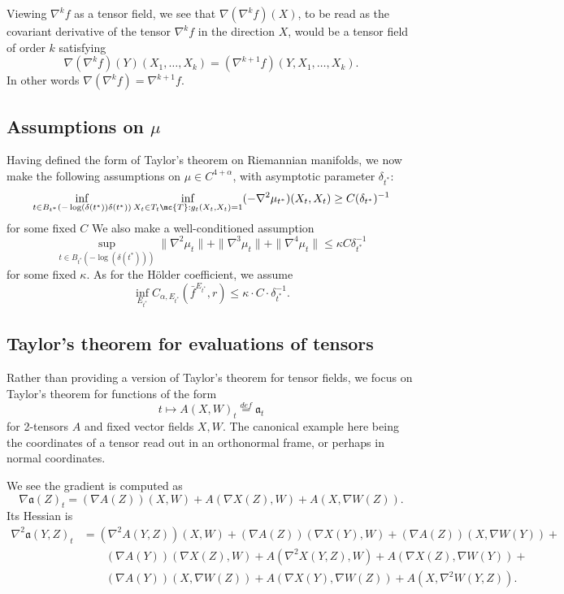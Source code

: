\documentclass{article}
\begin{document}
Viewing $\nabla^{k} f$ as a tensor field, we see that $\nabla ( \nabla^k f)(X)$, to be read as the covariant derivative of the tensor $\nabla^k f$ in the direction
$X$, would be a tensor field of order $k$ satisfying
$$
\nabla(\nabla^k f)(Y)(X_1, \dots, X_k) = (\nabla^{k+1} f)(Y, X_1, \dots, X_k).
$$
In other words $\nabla (\nabla^k f) = \nabla^{k+1} f$.

\subsection{Assumptions on $\mu$}

Having defined the form of Taylor's theorem on Riemannian manifolds, 
we now make the following assumptions on $\mu \in C^{4+\alpha}$, with asymptotic parameter $\delta_{t^*}$:
$$
\inf_{t \in B_{t^*}(-\log(\delta(t^*)) \delta(t^*))} \inf_{X_t \in T_t\mc{T}: g_t(X_t,X_t)=1} (-\nabla^2 \mu_{t^*})(X_t, X_t) \geq C (\delta_{t^*})^{-1}
$$
for some fixed $C$
  We also make a well-conditioned assumption 
  $$
\sup_{t \in B_{t^*}(-\log(\delta(t^*)))} \|\nabla^2 \mu_t\| + \|\nabla^3 \mu_t\| + \|\nabla^4 \mu_t\| \leq \kappa C \delta_{t^*}^{-1}
  $$
for some fixed $\kappa$. As for the H\"older coefficient, we assume
$$\inf_{E_{t^*}} C_{\alpha, E_{t^*}}(\bar{f}^{E_{t^*}}, r) \leq \kappa \cdot C \cdot \delta_{t^*}^{-1}.$$


\subsection{Taylor's theorem for evaluations of tensors}

Rather than providing a version of Taylor's theorem for tensor fields, we focus on Taylor's theorem for functions of
the form
$$
t \mapsto A(X,W)_t \overset{def}{=} \mathfrak{a}_t
$$
for 2-tensors $A$ and fixed vector fields $X, W$. The canonical example here being the coordinates
of a tensor read out in an orthonormal frame, or perhaps in normal coordinates.

We see the gradient is computed as
$$
\nabla \mathfrak{a}(Z)_t = (\nabla A(Z))(X, W) + A(\nabla X(Z), W) + A(X, \nabla W(Z)).
$$
Its Hessian is
$$
\begin{aligned}
  \nabla^2 \mathfrak{a}(Y, Z)_t &= (\nabla^2 A(Y,Z))(X, W) + (\nabla A(Z))(\nabla X(Y), W) + (\nabla A(Z))(X, \nabla W(Y)) + \\
& \qquad  (\nabla A(Y))(\nabla X(Z), W) + A(\nabla^2 X(Y, Z), W) + A(\nabla X(Z), \nabla W(Y)) + \\
& \qquad  (\nabla A(Y))(X, \nabla W(Z)) + A(\nabla X(Y), \nabla W(Z)) + A(X, \nabla^2 W(Y, Z)).  \\
\end{aligned}
$$
\end{document}
